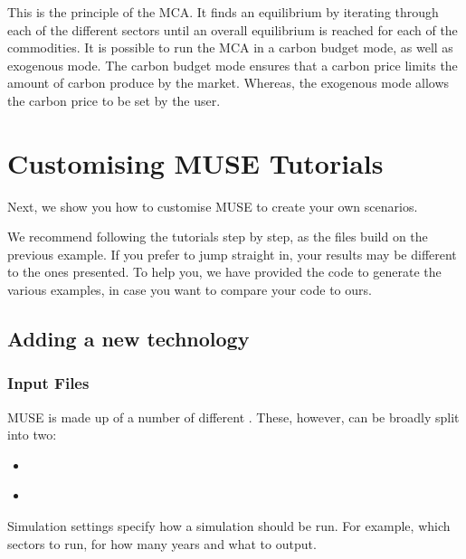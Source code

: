 \documentclass[letterpaper,10pt,english]{sphinxmanual}
\begin{document}
This is the principle of the MCA. It finds an equilibrium by iterating through each of the different sectors until an overall equilibrium is reached for each of the commodities. It is possible to run the MCA in a carbon budget mode, as well as exogenous mode. The carbon budget mode ensures that a carbon price limits the amount of carbon produce by the market. Whereas, the exogenous mode allows the carbon price to be set by the user.


\chapter{Customising MUSE Tutorials}
\label{\detokenize{user-guide/index:customising-muse-tutorials}}\label{\detokenize{user-guide/index::doc}}
Next, we show you how to customise MUSE to create your own scenarios.

We recommend following the tutorials step by step, as the files build on the previous example. If you prefer to jump straight in, your results may be different to the ones presented. To help you, we have provided the code to generate the various examples, in case you want to compare your code to ours.


\section{Adding a new technology}
\label{\detokenize{user-guide/add-solar:Adding-a-new-technology}}\label{\detokenize{user-guide/add-solar::doc}}

\subsection{Input Files}
\label{\detokenize{user-guide/add-solar:Input-Files}}
MUSE is made up of a number of different {\hyperref[\detokenize{inputs/index::doc}]{}}. These, however, can be broadly split into two:
\begin{itemize}
\item {} 
{\hyperref[\detokenize{inputs/toml::doc}]{}}

\item {} 
{\hyperref[\detokenize{inputs/inputs_csv::doc}]{}}

\end{itemize}

Simulation settings specify how a simulation should be run. For example, which sectors to run, for how many years and what to output.
\end{document}

